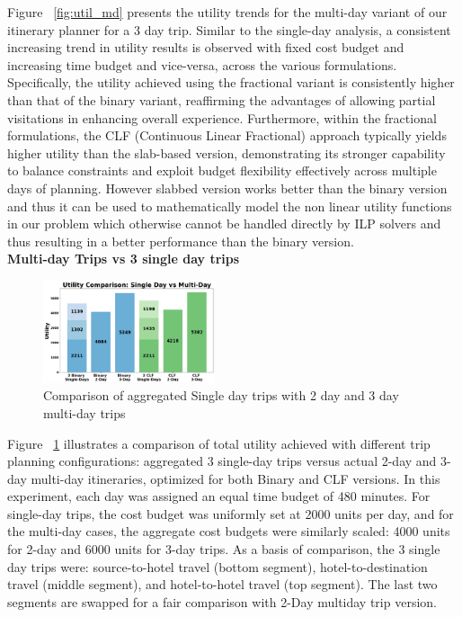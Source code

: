 Figure ~\ref{fig:util_md} presents the utility trends for the multi-day variant of our itinerary planner for a 3 day trip. Similar to the single-day analysis, a consistent increasing trend in utility results is observed with fixed cost budget and increasing time budget and vice-versa, across the various formulations. Specifically, the utility achieved using the fractional variant is consistently higher than that of the binary variant, reaffirming the advantages of allowing partial visitations in enhancing overall experience. Furthermore, within the fractional formulations, the CLF (Continuous Linear Fractional) approach typically yields higher utility than the slab-based version, demonstrating its stronger capability to balance constraints and exploit budget flexibility effectively across multiple days of planning. However slabbed version works better than the binary version and thus it can be used to mathematically model the non linear utility functions in our problem which otherwise cannot be handled directly by ILP solvers and thus resulting in a better performance than the binary version.\\

\noindent\textbf{Multi-day Trips vs 3 single day trips}
\begin{figure}[th]
\centering
\includegraphics[width=0.45\textwidth]{plots/multivssingle.png}
\caption{Comparison of aggregated Single day trips with 2 day and 3 day multi-day trips}
\label{fig:singlevsmultiday}
\end{figure}
Figure ~\ref{fig:singlevsmultiday}  illustrates a comparison of total utility achieved with different trip planning configurations: aggregated 3 single-day trips versus actual 2-day and 3-day multi-day itineraries, optimized for both Binary and CLF versions. In this experiment, each day was assigned an equal time budget of 480 minutes. For single-day trips, the cost budget was uniformly set at 2000 units per day, and for the multi-day cases, the aggregate cost budgets were similarly scaled: 4000 units for 2-day and 6000 units for 3-day trips. As a basis of comparison, the 3 single day trips were: source-to-hotel travel (bottom segment), hotel-to-destination travel (middle segment), and hotel-to-hotel travel (top segment). The last two segments are swapped for a fair comparison with 2-Day multiday trip version.\\

